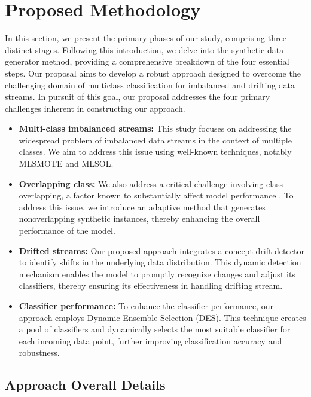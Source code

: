 \section{Proposed Methodology}
\label{sec:4_first_proposed_approach}

In this section, we present the primary phases of our study, comprising three distinct stages. Following this introduction, we delve into the synthetic data-generator method, providing a comprehensive breakdown of the four essential steps. Our proposal aims to develop a robust approach designed to overcome the challenging domain of multiclass classification for imbalanced and drifting data streams. In pursuit of this goal, our proposal addresses the four primary challenges inherent in constructing our approach.
\begin{itemize}
	\item \textbf{Multi-class imbalanced streams:} This study focuses on addressing the widespread problem of imbalanced data streams in the context of multiple classes. We aim to address this issue using well-known techniques, notably MLSMOTE and MLSOL.
	\item \textbf{Overlapping class:} We also address a critical challenge involving class overlapping, a factor known to substantially affect model performance \cite{cruz2017meta, widmer1996learning}. To address this issue, we introduce an adaptive method that generates nonoverlapping synthetic instances, thereby enhancing the overall performance of the model.
	\item \textbf{Drifted streams:} Our proposed approach integrates a concept drift detector to identify shifts in the underlying data distribution. This dynamic detection mechanism enables the model to promptly recognize changes and adjust its classifiers, thereby ensuring its effectiveness in handling drifting stream.
	\item \textbf{Classifier performance:} To enhance the classifier performance, our approach employs Dynamic Ensemble Selection (DES). This technique creates a pool of classifiers and dynamically selects the most suitable classifier for each incoming data point, further improving classification accuracy and robustness.
\end{itemize}

\subsection{Approach Overall Details}

